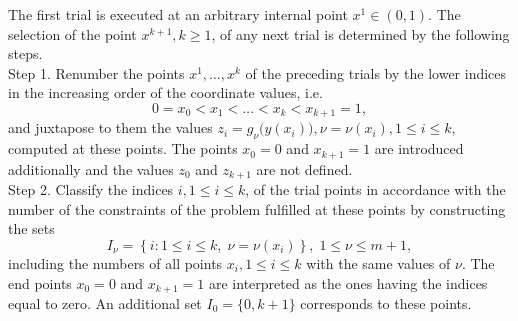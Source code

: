 \documentclass[review]{elsarticle}
\begin{document}
	The first trial is executed at an arbitrary internal point $x^1 \in (0,1)$. The selection of the point $ x^{k+1}, k \geq 1$, of any next trial is determined by the following steps. \\
Step 1. Renumber the points $x^1, \ldots, x^k$ of the preceding trials by the lower indices in the increasing order of the coordinate values, i.e.
$$
	0=x_0<x_1<\dots <x_k<x_{k+1}=1,
$$
and juxtapose to them the values $z_i=g_{\nu}\big(y(x_i)\big),\nu=\nu(x_i), 1 \leq i \leq k$, computed at these points. The points $x_0=0$ and $x_{k+1}=1$ are introduced additionally and the values $z_0$ and $z_{k+1}$ are not defined. \\
Step 2. Classify the indices $i, 1 \leq i \leq k$, of the trial points in accordance with the number of the constraints of the problem fulfilled at these points by constructing the sets
$$
	I_\nu =\left\{i:1 \leq i \leq k, \; \nu=\nu(x_i) \right\}, \; 1 \leq \nu \leq m+1,
$$
including the numbers of all points $x_i, 1 \leq i \leq k$ with the same values of $\nu$. The end points $x_0=0$ and $x_{k+1}=1$ are interpreted as the ones having the indices equal to zero. An additional set $I_0=\{0, k+1\}$ corresponds to these points.
\end{document}
